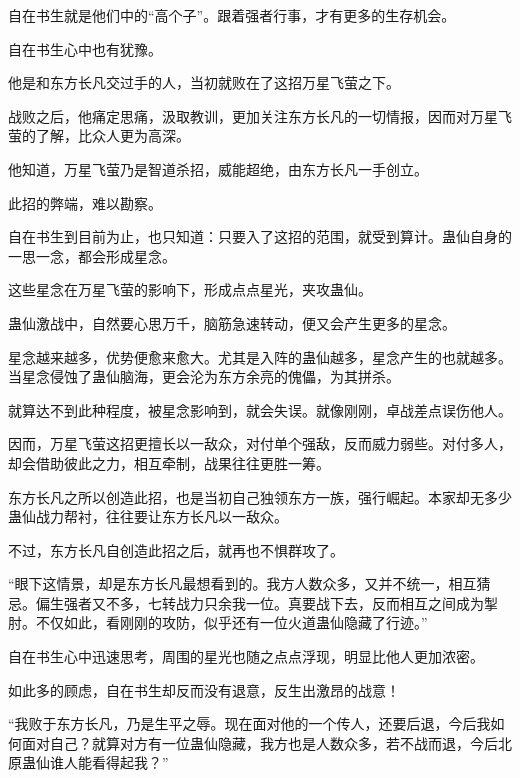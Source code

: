 \begin{this_body}
自在书生就是他们中的“高个子”。跟着强者行事，才有更多的生存机会。

自在书生心中也有犹豫。

他是和东方长凡交过手的人，当初就败在了这招万星飞萤之下。

战败之后，他痛定思痛，汲取教训，更加关注东方长凡的一切情报，因而对万星飞萤的了解，比众人更为高深。

他知道，万星飞萤乃是智道杀招，威能超绝，由东方长凡一手创立。

此招的弊端，难以勘察。

自在书生到目前为止，也只知道：只要入了这招的范围，就受到算计。蛊仙自身的一思一念，都会形成星念。

这些星念在万星飞萤的影响下，形成点点星光，夹攻蛊仙。

蛊仙激战中，自然要心思万千，脑筋急速转动，便又会产生更多的星念。

星念越来越多，优势便愈来愈大。尤其是入阵的蛊仙越多，星念产生的也就越多。当星念侵蚀了蛊仙脑海，更会沦为东方余亮的傀儡，为其拼杀。

就算达不到此种程度，被星念影响到，就会失误。就像刚刚，卓战差点误伤他人。

因而，万星飞萤这招更擅长以一敌众，对付单个强敌，反而威力弱些。对付多人，却会借助彼此之力，相互牵制，战果往往更胜一筹。

东方长凡之所以创造此招，也是当初自己独领东方一族，强行崛起。本家却无多少蛊仙战力帮衬，往往要让东方长凡以一敌众。

不过，东方长凡自创造此招之后，就再也不惧群攻了。

“眼下这情景，却是东方长凡最想看到的。我方人数众多，又并不统一，相互猜忌。偏生强者又不多，七转战力只余我一位。真要战下去，反而相互之间成为掣肘。不仅如此，看刚刚的攻防，似乎还有一位火道蛊仙隐藏了行迹。”

自在书生心中迅速思考，周围的星光也随之点点浮现，明显比他人更加浓密。

如此多的顾虑，自在书生却反而没有退意，反生出激昂的战意！

“我败于东方长凡，乃是生平之辱。现在面对他的一个传人，还要后退，今后我如何面对自己？就算对方有一位蛊仙隐藏，我方也是人数众多，若不战而退，今后北原蛊仙谁人能看得起我？”

\end{this_body}

